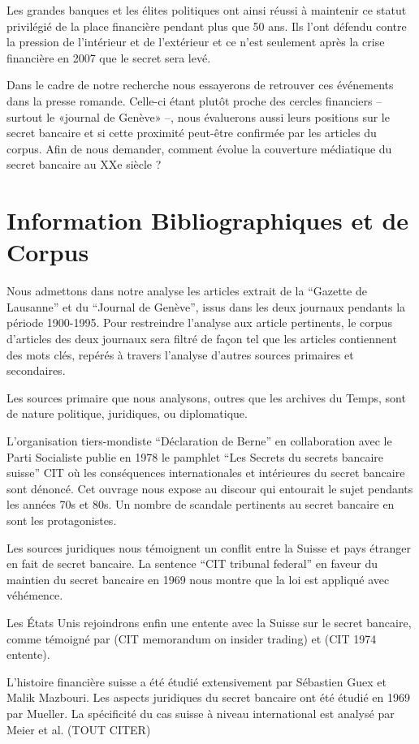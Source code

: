 \documentclass[ebook,9pt,oneside,openany]{memoir}
\begin{document}
Les grandes banques et les élites politiques ont ainsi réussi à maintenir ce statut privilégié de la place financière pendant plus que 50 ans. Ils l’ont défendu contre la pression de l’intérieur et de l’extérieur et ce n’est seulement après la crise financière en 2007 que le secret sera levé.

Dans le cadre de notre recherche nous essayerons de retrouver ces événements dans la presse romande. Celle-ci étant plutôt proche des cercles financiers – surtout le «journal de Genève» –, nous évaluerons aussi leurs positions sur le secret bancaire et si cette proximité peut-être confirmée par les articles du corpus. Afin de nous demander, comment évolue la couverture médiatique du secret bancaire au XXe siècle ?
\section*{Information Bibliographiques et de Corpus}
Nous admettons dans notre analyse les articles extrait de la “Gazette de Lausanne” et du “Journal de Genève”, issus dans les deux journaux pendants la période 1900-1995. Pour restreindre l’analyse aux article pertinents, le corpus d’articles des deux journaux sera filtré de façon tel que les articles contiennent des mots clés, repérés à travers l’analyse d’autres sources primaires et secondaires.

Les sources primaire que nous analysons, outres que les archives du Temps, sont de nature politique, juridiques, ou diplomatique.

L’organisation tiers-mondiste “Déclaration de Berne” en collaboration avec le Parti Socialiste publie en 1978 le pamphlet “Les Secrets du secrets bancaire suisse” CIT où les conséquences internationales et intérieures du secret bancaire sont dénoncé. Cet ouvrage nous expose au discour qui entourait le sujet pendants les années 70s et 80s. Un nombre de scandale pertinents au secret bancaire en sont les protagonistes.

Les sources juridiques nous témoignent un conflit entre la Suisse et pays étranger en fait de secret bancaire. La sentence “CIT tribunal federal” en faveur du maintien du secret bancaire en 1969 nous montre que la loi est appliqué avec véhémence.

Les États Unis rejoindrons enfin une entente avec la Suisse sur le secret bancaire, comme témoigné par (CIT memorandum on insider trading) et (CIT 1974 entente).

L’histoire financière suisse a été étudié extensivement par Sébastien Guex et Malik Mazbouri.
Les aspects juridiques du secret bancaire ont été étudié en 1969 par Mueller. La spécificité du cas suisse à niveau international est analysé par Meier et al. (TOUT CITER)
\end{document}
